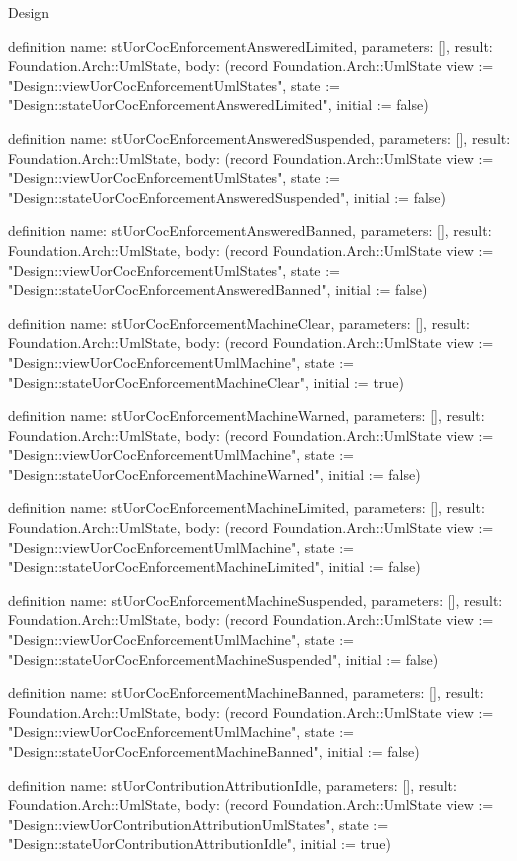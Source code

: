 \begin{lexlean}{Design}
\begin{semanticmodule}
definition{
  name: stUorCocEnforcementAnsweredLimited,
  parameters: [],
  result: Foundation.Arch::UmlState,
  body: (record Foundation.Arch::UmlState {view := "Design::viewUorCocEnforcementUmlStates", state := "Design::stateUorCocEnforcementAnsweredLimited", initial := false})
}

definition{
  name: stUorCocEnforcementAnsweredSuspended,
  parameters: [],
  result: Foundation.Arch::UmlState,
  body: (record Foundation.Arch::UmlState {view := "Design::viewUorCocEnforcementUmlStates", state := "Design::stateUorCocEnforcementAnsweredSuspended", initial := false})
}

definition{
  name: stUorCocEnforcementAnsweredBanned,
  parameters: [],
  result: Foundation.Arch::UmlState,
  body: (record Foundation.Arch::UmlState {view := "Design::viewUorCocEnforcementUmlStates", state := "Design::stateUorCocEnforcementAnsweredBanned", initial := false})
}

definition{
  name: stUorCocEnforcementMachineClear,
  parameters: [],
  result: Foundation.Arch::UmlState,
  body: (record Foundation.Arch::UmlState {view := "Design::viewUorCocEnforcementUmlMachine", state := "Design::stateUorCocEnforcementMachineClear", initial := true})
}

definition{
  name: stUorCocEnforcementMachineWarned,
  parameters: [],
  result: Foundation.Arch::UmlState,
  body: (record Foundation.Arch::UmlState {view := "Design::viewUorCocEnforcementUmlMachine", state := "Design::stateUorCocEnforcementMachineWarned", initial := false})
}

definition{
  name: stUorCocEnforcementMachineLimited,
  parameters: [],
  result: Foundation.Arch::UmlState,
  body: (record Foundation.Arch::UmlState {view := "Design::viewUorCocEnforcementUmlMachine", state := "Design::stateUorCocEnforcementMachineLimited", initial := false})
}

definition{
  name: stUorCocEnforcementMachineSuspended,
  parameters: [],
  result: Foundation.Arch::UmlState,
  body: (record Foundation.Arch::UmlState {view := "Design::viewUorCocEnforcementUmlMachine", state := "Design::stateUorCocEnforcementMachineSuspended", initial := false})
}

definition{
  name: stUorCocEnforcementMachineBanned,
  parameters: [],
  result: Foundation.Arch::UmlState,
  body: (record Foundation.Arch::UmlState {view := "Design::viewUorCocEnforcementUmlMachine", state := "Design::stateUorCocEnforcementMachineBanned", initial := false})
}

definition{
  name: stUorContributionAttributionIdle,
  parameters: [],
  result: Foundation.Arch::UmlState,
  body: (record Foundation.Arch::UmlState {view := "Design::viewUorContributionAttributionUmlStates", state := "Design::stateUorContributionAttributionIdle", initial := true})
}


\end{semanticmodule}
\end{lexlean}
